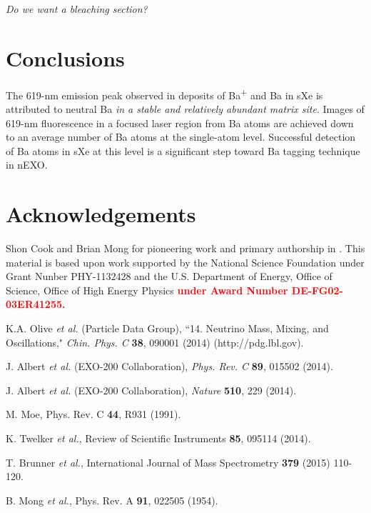 \documentclass[aps,pra,reprint,superscriptaddress]{revtex4-1}
\begin{document}

\emph{\color{gray}Do we want a bleaching section?}

\section{Conclusions}

The 619-nm emission peak observed in deposits of Ba\textsuperscript{+} and Ba in sXe is attributed to neutral Ba \emph{\color{gray}in a stable and relatively abundant matrix site}.
Images of 619-nm fluorescence in a focused laser region from Ba atoms are achieved down to an average number of Ba atoms at the single-atom level.  Successful detection of Ba atoms in sXe at this level is a significant step toward Ba tagging technique in nEXO. 

\section*{Acknowledgements}

Shon Cook and Brian Mong for pioneering work and primary authorship in \cite{Mong2015}.  This material is based upon work supported by the National Science Foundation under Grant Nunber PHY-1132428 and the U.S. Department of Energy, Office of Science, Office of High Energy Physics \textbf{\textcolor{red}{under Award Number DE-FG02-03ER41255.}}

%
\begin{thebibliography}{00}
  K.A. Olive \emph{et al.} (Particle Data Group), ``14. Neutrino Mass, Mixing, and Oscillations," \emph{Chin. Phys. C} \textbf{38}, 090001 (2014) (http://pdg.lbl.gov).


 J. Albert \emph{et al.} (EXO-200 Collaboration), \emph{Phys. Rev. C} \textbf{89}, 015502 (2014).

 J. Albert \emph{et al.} (EXO-200 Collaboration), \emph{Nature} \textbf{510}, 229 (2014).

 M. Moe, Phys. Rev. C \textbf{44}, R931 (1991).

 K. Twelker \emph{ et al.}, Review of Scientific Instruments \textbf{85}, 095114 (2014).

 T. Brunner \emph{ et al.}, International Journal of Mass Spectrometry {\color{red}\textbf{379} (2015) 110-120.}

 B. Mong \emph{ et al.}, Phys. Rev. A \textbf{91}, 022505 (1954).
\end{thebibliography}
\end{document}
